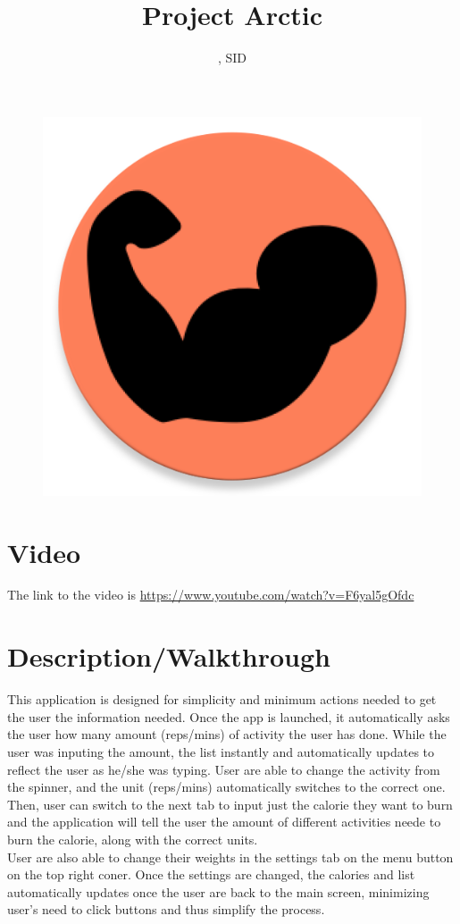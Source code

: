 \documentclass[11pt]{article}
\title{Project Arctic}
\author{\Name, SID \SID}
\date{}
\newcommand{\tab}{\hspace*{25pt}}
\begin{document}
\maketitle
\begin{figure}[ht]
	\includegraphics[scale=0.5]{icon.png}
	\centering
\end{figure}

\newpage
\section{Video}
The link to the video is \url{https://www.youtube.com/watch?v=F6yal5gOfdc}

\section{Description/Walkthrough}
\tab This application is designed for simplicity and minimum actions needed to get the 
user the information needed. Once the app is launched, it automatically asks the user how many
amount (reps/mins) of activity the user has done. While the user was inputing the amount, the
list instantly and automatically updates to reflect the user as he/she was typing. User
are able to change the activity from the spinner, and the unit (reps/mins) automatically
switches to the correct one. Then, user can switch to the next tab to input just the calorie
they want to burn and the application will tell the user the amount of different activities
neede to burn the calorie, along with the correct units.\\
\tab User are also able to change their weights in the settings tab on the menu button on
the top right coner. Once the settings are changed, the calories and list automatically updates
once the user are back to the main screen, minimizing user's need to click buttons and thus
simplify the process.
\end{document}
